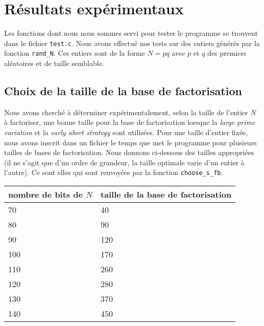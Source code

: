 \section{Résultats expérimentaux}

Les fonctions dont nous nous sommes servi pour tester le programme se trouvent
dans le fichier \texttt{test.c}. Nous avons effectué nos tests sur des entiers
générés par la fonction \texttt{rand\_N}. Ces entiers sont de la forme $N = pq$
avec $p$ et $q$ des premiers aléatoires et de taille semblable. 

\subsection{Choix de la taille de la base de factorisation}

Nous avons cherché à déterminer expérimentalement, selon la taille de l'entier
$N$ à factoriser, une bonne taille pour la base de factorisation lorsque la \textit{large
prime variation} et la \textit{early abort strategy} sont utilisées. Pour une
taille d'entier fixée, nous avons inscrit dans un fichier le temps que met le
programme pour plusieurs tailles de bases de factorisation.
Nous donnons ci-dessous des tailles appropriées (il ne s'agit que d'un
ordre de grandeur, la taille optimale varie d'un entier à l'autre). Ce sont
elles qui sont renvoyées par la fonction \texttt{choose\_s\_fb}.

\begin{center}
    \begin{tabular}{ |l |l | }
        \hline
         nombre de bits de $N$ & taille de la base de factorisation \\ \hline
         70                    & 40                                 \\ \hline
         80                    & 90                                 \\ \hline
         90                    & 120                                \\ \hline 
         100                   & 170                                \\ \hline 
         110                   & 260                                \\ \hline 
         120                   & 280                                \\ \hline 
         130                   & 370                                \\ \hline 
         140                   & 450                                \\ \hline 
    \end{tabular}
\end{center}

